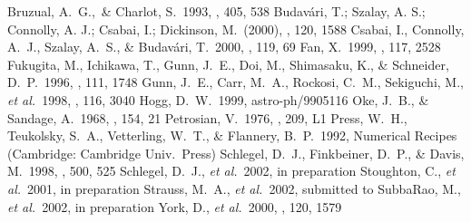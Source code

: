 Bruzual, A.~G.,~\& Charlot, S.~1993, \apj, {405}, 538
Budav\'ari, T.; Szalay, A. S.; Connolly, A. J.; Csabai, I.; Dickinson,
M.~(2000), \aj, 120, 1588
Csabai, I., Connolly, A.~J., Szalay, A.~S., \& Budav\'ari,
T.~2000, \aj, 119, 69
Fan, X.~1999, \aj, 117, 2528
Fukugita, M., Ichikawa, T., Gunn, J.~E., Doi, M., Shimasaku, K., \&
Schneider, D.~P.~1996, \aj, 111, 1748
Gunn, J.~E., Carr, M.~A., Rockosi, C.~M., Sekiguchi, M., {\it et al.}~1998, \aj, 116, 3040
Hogg, D.~W.~1999, astro-ph/9905116 
Oke, J.~B., \& Sandage, A.~1968, \apj, 154, 21
Petrosian, V.~1976, \apj, 209, L1
Press, W.~H., Teukolsky, S.~A., Vetterling, W.~T., \& Flannery,
B.~P.~1992, Numerical Recipes (Cambridge: Cambridge Univ.~Press)
Schlegel, D.~J., Finkbeiner, D.~P., \& Davis, M.~1998, \apj, 500, 525
Schlegel, D.~J., {\it et al.}~2002, in preparation
Stoughton, C., {\it et al.}~2001, in preparation
Strauss, M.~A., {\it et al.}~2002, submitted to \aj
{}
SubbaRao, M., {\it et al.}~2002, in preparation
York, D., {\it et al.}~2000, \aj, 120, 1579
